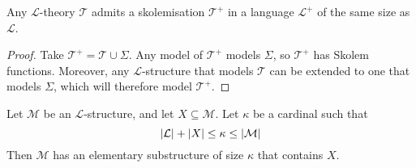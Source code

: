 \begin{corollary}
    Any \( \mathcal L \)-theory \( \mathcal T \) admits a skolemisation \( \mathcal T^+ \) in a language \( \mathcal L^+ \) of the same size as \( \mathcal L \).
\end{corollary}
\begin{proof}
    Take \( \mathcal T^+ = \mathcal T \cup \Sigma \).
    Any model of \( \mathcal T^+ \) models \( \Sigma \), so \( \mathcal T^+ \) has Skolem functions.
    Moreover, any \( \mathcal L \)-structure that models \( \mathcal T \) can be extended to one that models \( \Sigma \), which will therefore model \( \mathcal T^+ \).
\end{proof}
\begin{corollary}
    Let \( \mathcal M \) be an \( \mathcal L \)-structure, and let \( X \subseteq \mathcal M \).
    Let \( \kappa \) be a cardinal such that
    \[ \abs{\mathcal L} + \abs{X} \leq \kappa \leq \abs{\mathcal M} \]
    Then \( \mathcal M \) has an elementary substructure of size \( \kappa \) that contains \( X \).
\end{corollary}
